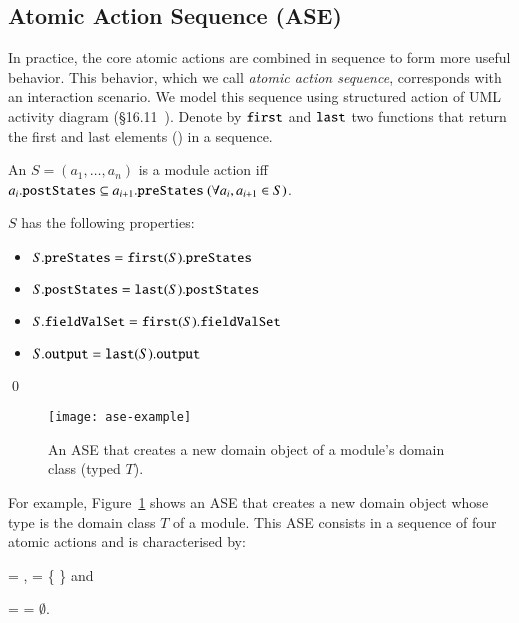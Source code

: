 \subsection{Atomic Action Sequence (ASE)} \label{sect:arch-ase}
In practice, the core atomic actions are combined in sequence to form more useful behavior. This behavior, which we call \textit{atomic action sequence}, corresponds with an interaction scenario. We model this sequence using structured action of UML activity diagram (\S{16.11}~\cite{omg_unified_2015}).
%
Denote by $ \func{first}$ and $ \func{last}$ two functions that return the first and last elements (\resp) in a sequence.
%
\begin{definition} \label{def:ase}
An  $S = (a_1,\dots,a_n)$ is a module action iff $a_i.{\tt postStates} \subseteq a_{i+1}.{\tt preStates} ~(\forall a_i, a_{i+1} \in S)$.

$S$ has the following properties:
\begin{itemize}
\item $S.\membern{preStates} = \func{first}(S).\membern{preStates}$
\item $S.\membern{postStates} = \func{last}(S).\membern{postStates}$ 
\item $S.\membern{fieldValSet} = \func{first}(S).\membern{fieldValSet}$
\item $S.\membern{output} = \func{last}(S).\membern{output}$ 
\end{itemize}
%
\qed
\end{definition}

%
\begin{figure}[ht]
	\centering
	\texttt{[image: ase-example]}
	\caption{An ASE that creates a new domain object of a module's domain class (typed $T$).} %
	\label{fig:ase-example}
\end{figure}

For example, Figure~\ref{fig:ase-example} shows an ASE that creates a new domain object whose type is the domain class $T$ of a module. This ASE consists in a sequence of four atomic actions and is characterised by:

  = ,  = \{  \} and

  =  = $\emptyset$.

